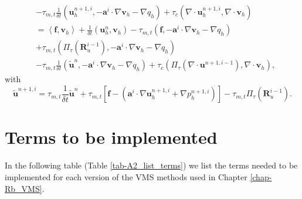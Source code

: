 \begin{align}
&-\tau_{m,t}\frac{1}{\delta t}(\mathbf{u}_h^{n+1,i},-\mathbf{a}^i\cdot\nabla\mathbf{v}_h-\nabla q_h)+\tau_c(\nabla\cdot\mathbf{u}_h^{n+1,i},\nabla\cdot\mathbf{v}_h)\\\nonumber
&=\left<\mathbf{f},\mathbf{v}_h\right>+\frac{1}{\delta t}(\mathbf{u}_h^n,\mathbf{v}_h)-\tau_{m,t}(\mathbf{f},-\mathbf{a}^i\cdot\nabla\mathbf{v}_h-\nabla q_h)\\\nonumber
&+\tau_{m,t}(\Pi_\tau(\mathbf{R}_u^{i-1}),-\mathbf{a}^i\cdot\nabla\mathbf{v}_h-\nabla q_h)\\\nonumber
&-\tau_{m,t}\frac{1}{\delta t}(\tilde{\mathbf{u}}^n,-\mathbf{a}^i\cdot\nabla\mathbf{v}_h-\nabla q_h)+\tau_c(\Pi_\tau(\nabla\cdot\mathbf{u}^{n+1,i-1}),\nabla\cdot\mathbf{v}_h), %
\end{align}
with
\begin{equation}
\label{17}
\tilde{\mathbf{u}}^{n+1,i}=\tau_{m,t}\frac{1}{\delta t}\tilde{\mathbf{u}}^n+\tau_{m,t}\left[\mathbf{f}-(\mathbf{a}^i\cdot\nabla\mathbf{u}_h^{n+1,i}+\nabla p_h^{n+1,i})\right]-\tau_{m,t}\Pi_\tau(\mathbf{R}_u^{i-1}).
\end{equation}

\section*{Terms to be implemented}
In the following table (Table \ref{tab-A2_list_terms}) we list the terms needed to be implemented for each version of the VMS methods used in Chapter \ref{chap-Rb_VMS}.

